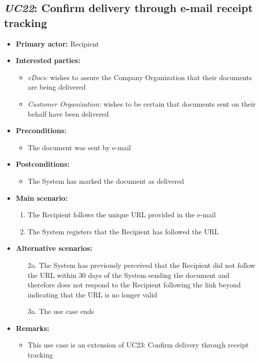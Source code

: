 \documentclass[a4paper,10pt]{article}
\begin{document}
\subsection{\emph{UC22}: Confirm delivery through e-mail receipt tracking}
\begin{itemize}
	\item \textbf{Primary actor:} Recipient
	\item \textbf{Interested parties:} 
	\begin{itemize}
		\item \textit{eDocs:} wishes to assure the Company Organization that their documents are being delivered
		\item \textit{Customer Organization:} wishes to be certain that documents sent on their behalf have been delivered
	\end{itemize}
	
	\item \textbf{Preconditions:}
	\begin{itemize}
		\item The document was sent by e-mail
	\end{itemize}
	
	\item \textbf{Postconditions:}
	\begin{itemize}
		\item The System has marked the document as delivered
	\end{itemize}
	
	\item \textbf{Main scenario:} 
	\begin{enumerate}
		\item The Recipient follows the unique URL provided in the e-mail
		\item The System registers that the Recipient has followed the URL
	\end{enumerate}
	
	\item \textbf{Alternative scenarios:} 
	\begin{enumerate}
		\item [2a.] The System has previously perceived that the Recipient did not follow the URL within 30 days of the System sending the document and therefore does not respond to the Recipient following the link beyond indicating that the URL is no longer valid
		\item [3a.] The use case ends
	\end{enumerate}
	
	\item \textbf{Remarks:}
	\begin{itemize}
		\item This use case is an extension of UC23: Confirm delivery through receipt tracking
	\end{itemize}
\end{itemize}
\end{document}
